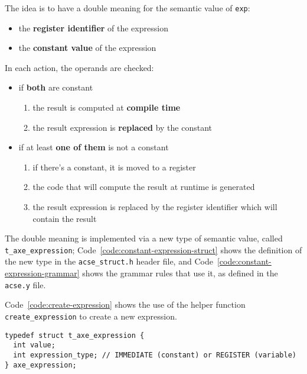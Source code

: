 \documentclass[english]{article}
\begin{document}
The idea is to have a double meaning for the semantic value of \texttt{exp}:
\begin{itemize}
  \item the \textbf{register identifier} of the expression
  \item the \textbf{constant value} of the expression
\end{itemize}

In each action, the operands are checked:

\begin{itemize}
  \item if \textbf{both} are constant
        \begin{enumerate}
          \item the result is computed at \textbf{compile time}
          \item the result expression is \textbf{replaced} by the constant
        \end{enumerate}
  \item if at least \textbf{one of them} is not a constant
        \begin{enumerate}
          \item if there's a constant, it is moved to a register
          \item the code that will compute the result at runtime is generated
          \item the result expression is replaced by the register identifier which will contain the result
        \end{enumerate}
\end{itemize}

The double meaning is implemented via a new type of semantic value, called \texttt{t\_axe\_expression};
Code~\ref{code:constant-expression-struct} shows the definition of the new type in the \texttt{acse\_struct.h} header file, and Code~\ref{code:constant-expression-grammar} shows the grammar rules that use it, as defined in the \texttt{acse.y} file.

Code~\ref{code:create-expression} shows the use of the helper function \texttt{create\_expression} to create a new expression.

\begin{onepage}
  \begin{lstlisting}[language=LANCE, caption={Constant expression struct in \texttt{acse\_struct.h}}, label={code:constant-expression-struct}]
typedef struct t_axe_expression {
  int value;
  int expression_type; // IMMEDIATE (constant) or REGISTER (variable)
} axe_expression;
\end{lstlisting}
\end{onepage}
\end{document}
